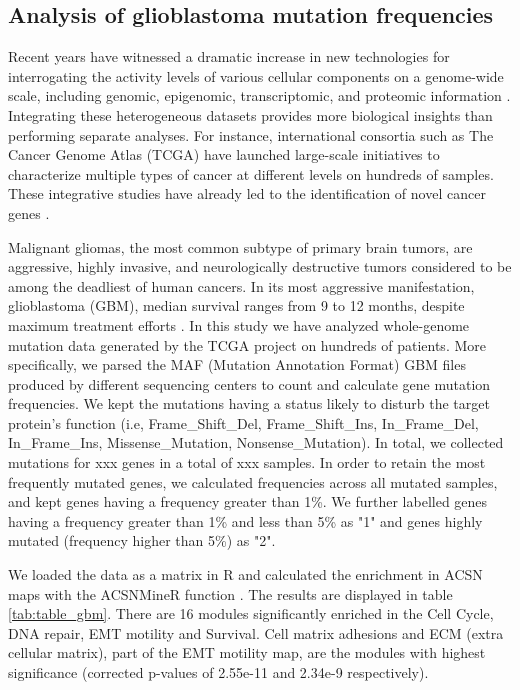 \documentclass[article]{jss}
\begin{document}
\subsection{Analysis of glioblastoma mutation frequencies}

Recent years have witnessed a dramatic increase in new technologies for
interrogating the activity levels of various cellular components on a
genome-wide scale, including genomic, epigenomic, transcriptomic, and proteomic
information \citep{hawkins2010next}. Integrating these heterogeneous datasets
provides more biological insights than performing separate analyses. For
instance, international consortia such as The Cancer Genome Atlas (TCGA) have
launched large-scale initiatives to characterize multiple types of cancer at
different levels on hundreds of samples.  These integrative studies have
already led to the identification of novel cancer genes
\citep{mclendon2008comprehensive}. 

Malignant gliomas, the most common subtype of primary brain tumors, are
aggressive, highly invasive, and neurologically destructive tumors considered to
be among the deadliest of human cancers. In its most aggressive manifestation,
glioblastoma (GBM), median survival ranges from 9 to 12 months, despite maximum
treatment efforts \citep{maher2001malignant}. In this study we have analyzed
whole-genome mutation data generated by the TCGA project on hundreds of
patients. More specifically, we parsed the MAF (Mutation Annotation Format) GBM
files produced by different sequencing centers to count and calculate gene
mutation frequencies. We kept the mutations having a status likely to disturb
the target protein's function (i.e, Frame\_Shift\_Del, Frame\_Shift\_Ins,
In\_Frame\_Del, In\_Frame\_Ins, Missense\_Mutation, Nonsense\_Mutation). In
total, we collected mutations for xxx genes in a total of xxx samples. In order
to retain the most frequently mutated genes, we calculated frequencies across
all mutated samples, and kept genes having a frequency greater than 1\%. We
further labelled genes having a frequency greater than 1\% and less than 5\% as "1"
and genes highly mutated (frequency higher than 5\%) as "2". 

We loaded the data as a matrix in R and calculated the enrichment in ACSN maps
with the ACSNMineR function . The results are displayed in
table \ref{tab:table_gbm}. There are 16 modules significantly enriched in the
Cell Cycle, DNA repair, EMT motility and Survival. Cell matrix adhesions and ECM
(extra cellular matrix), part of the EMT motility map, are the modules with
highest significance (corrected p-values of 2.55e-11 and 2.34e-9 respectively). 
\end{document}
